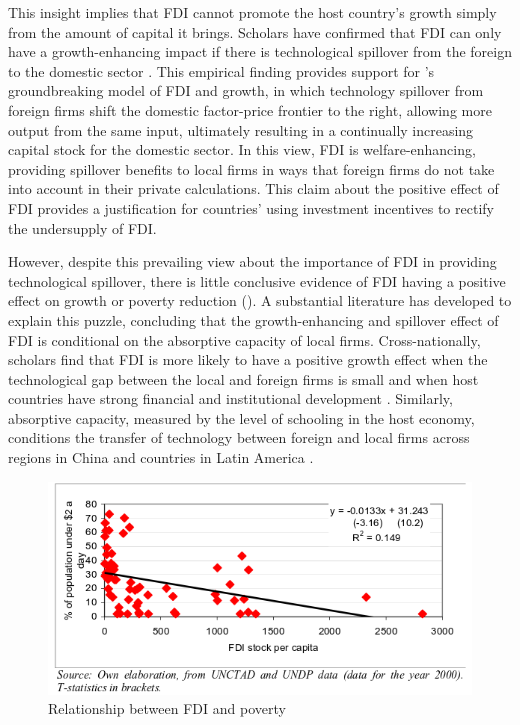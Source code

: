 This insight implies that FDI cannot promote the host country's growth simply from the amount of capital it brings. Scholars have confirmed that FDI can only have a growth-enhancing impact if there is technological spillover from the foreign to the domestic sector \citep{Nunnenkamp2004}. This empirical finding provides support for \citet{Findlay1978}'s groundbreaking model of FDI and growth, in which technology spillover from foreign firms shift the domestic factor-price frontier to the right, allowing more output from the same input, ultimately resulting in a continually increasing capital stock for the domestic sector. In this view, FDI is welfare-enhancing, providing spillover benefits to local firms in ways that foreign firms do not take into account in their private calculations. This claim about the positive effect of FDI provides a justification for countries' using investment incentives to rectify the undersupply of FDI. 

However, despite this prevailing view about the importance of FDI in providing technological spillover, there is little conclusive evidence of FDI having a positive effect on growth \citep{Nair-Reichert2001, Carkovic2002} or poverty reduction \citep{Guerra2009} (). A substantial literature has developed to explain this puzzle, concluding that the growth-enhancing and spillover effect of FDI is conditional on the absorptive capacity of local firms. Cross-nationally, scholars find that FDI is more likely to have a positive growth effect when the technological gap between the local and foreign firms is small \citep{Nunnenkamp2004} and when host countries have strong financial and institutional development \citep{Durham2004}. Similarly, absorptive capacity, measured by the level of schooling in the host economy, conditions the transfer of technology between foreign and local firms across regions in China \citep{Fu2008} and countries in Latin America \citep{Willem2004}.

\begin{figure}[!ht]
\includegraphics[width=\textwidth, height=\textheight,keepaspectratio]{../figure/fdi_poverty}
\caption{Relationship between FDI and poverty}
\label{fig:fdipoverty}
\end{figure}

